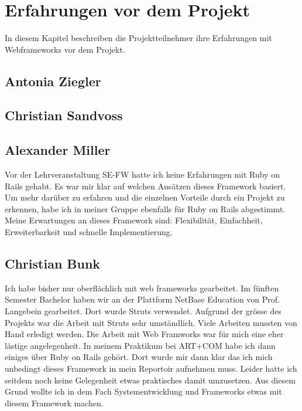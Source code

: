 \chapter{Erfahrungen vor dem Projekt}
In diesem Kapitel beschreiben die Projektteilnehmer ihre Erfahrungen mit Webframeworks vor dem Projekt.
\section{Antonia Ziegler}

\section{Christian Sandvoss}

\section{Alexander Miller}
Vor der Lehrveranstaltung SE-FW hatte ich keine Erfahrungen mit Ruby on Rails gehabt. Es war mir klar auf welchen Ansätzen dieses Framework basiert. Um mehr darüber zu erfahren und die einzelnen Vorteile durch ein Projekt zu erkennen, habe ich in meiner Gruppe ebenfalls für Ruby on Rails abgestimmt. Meine Erwartungen an dieses Framework sind: Flexibilität, Einfachheit, Erweiterbarkeit und schnelle Implementierung.

\section{Christian Bunk}
Ich habe bisher nur oberflächlich mit web frameworks gearbeitet. 
Im fünften Semester Bachelor haben wir an der Plattform NetBase Education von Prof. Langebein gearbeitet. 
Dort wurde Struts verwendet. Aufgrund der grösse des Projekts war die Arbeit mit Struts sehr umständlich. 
Viele Arbeiten mussten von Hand erledigt werden. Die Arbeit mit Web Framworks war für mich eine eher lästige angelegenheit. 
In meinem Praktikum bei ART+COM habe ich dann einiges über Ruby on Rails gehört. 
Dort wurde mir dann klar das ich mich unbedingt dieses Framework in mein Reportoir aufnehmen muss. 
Leider hatte ich seitdem noch keine Gelegenheit etwas praktisches damit umzusetzen. 
Aus diesem Grund wollte ich in dem Fach Systementwicklung und Frameworks etwas mit diesem Framework machen.

